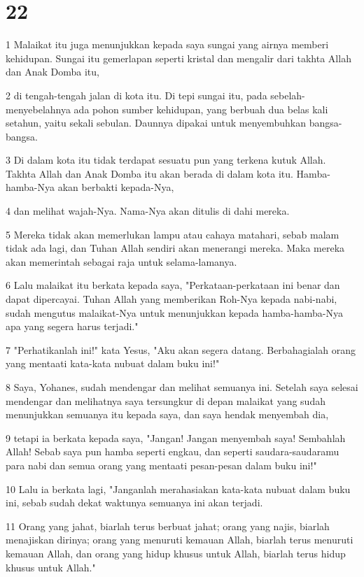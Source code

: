 \chapter{22}

\par 1 Malaikat itu juga menunjukkan kepada saya sungai yang airnya memberi kehidupan. Sungai itu gemerlapan seperti kristal dan mengalir dari takhta Allah dan Anak Domba itu,
\par 2 di tengah-tengah jalan di kota itu. Di tepi sungai itu, pada sebelah-menyebelahnya ada pohon sumber kehidupan, yang berbuah dua belas kali setahun, yaitu sekali sebulan. Daunnya dipakai untuk menyembuhkan bangsa-bangsa.
\par 3 Di dalam kota itu tidak terdapat sesuatu pun yang terkena kutuk Allah. Takhta Allah dan Anak Domba itu akan berada di dalam kota itu. Hamba-hamba-Nya akan berbakti kepada-Nya,
\par 4 dan melihat wajah-Nya. Nama-Nya akan ditulis di dahi mereka.
\par 5 Mereka tidak akan memerlukan lampu atau cahaya matahari, sebab malam tidak ada lagi, dan Tuhan Allah sendiri akan menerangi mereka. Maka mereka akan memerintah sebagai raja untuk selama-lamanya.
\par 6 Lalu malaikat itu berkata kepada saya, "Perkataan-perkataan ini benar dan dapat dipercayai. Tuhan Allah yang memberikan Roh-Nya kepada nabi-nabi, sudah mengutus malaikat-Nya untuk menunjukkan kepada hamba-hamba-Nya apa yang segera harus terjadi."
\par 7 "Perhatikanlah ini!" kata Yesus, "Aku akan segera datang. Berbahagialah orang yang mentaati kata-kata nubuat dalam buku ini!"
\par 8 Saya, Yohanes, sudah mendengar dan melihat semuanya ini. Setelah saya selesai mendengar dan melihatnya saya tersungkur di depan malaikat yang sudah menunjukkan semuanya itu kepada saya, dan saya hendak menyembah dia,
\par 9 tetapi ia berkata kepada saya, "Jangan! Jangan menyembah saya! Sembahlah Allah! Sebab saya pun hamba seperti engkau, dan seperti saudara-saudaramu para nabi dan semua orang yang mentaati pesan-pesan dalam buku ini!"
\par 10 Lalu ia berkata lagi, "Janganlah merahasiakan kata-kata nubuat dalam buku ini, sebab sudah dekat waktunya semuanya ini akan terjadi.
\par 11 Orang yang jahat, biarlah terus berbuat jahat; orang yang najis, biarlah menajiskan dirinya; orang yang menuruti kemauan Allah, biarlah terus menuruti kemauan Allah, dan orang yang hidup khusus untuk Allah, biarlah terus hidup khusus untuk Allah."
